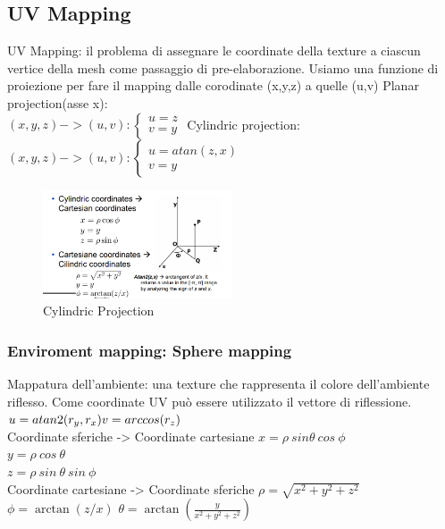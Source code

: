 \subsection{UV Mapping}

UV Mapping: il problema di assegnare le coordinate della texture a ciascun vertice della mesh come passaggio di pre-elaborazione.
Usiamo una funzione di proiezione per fare il mapping dalle corodinate (x,y,z) a quelle (u,v)
Planar projection(asse x): \\

$ (x,y,z) -> (u,v) :\begin{cases}
    u=z \\
    v=y
\end{cases}$
Cylindric projection: \\

$(x,y,z) -> (u,v) :\begin{cases}
    u=atan(z,x) \\
    v=y
\end{cases}$

\begin{figure}[H]
    \centering
    \includegraphics[width=0.5\textwidth]{images/project.png} 
    \caption{Cylindric Projection}
    \label{fig:immagine}
\end{figure}
\subsubsection{Enviroment mapping: Sphere mapping}
Mappatura dell'ambiente: una texture che rappresenta il colore dell'ambiente riflesso. Come coordinate UV può essere utilizzato il vettore di riflessione.
$ u= atan2(r_y,r_x) \\
 v= arccos(r_z)$ \\

Coordinate sferiche -> Coordinate cartesiane
$
x= \rho \ sin \theta \ cos \ \phi$ \\
\vspace{10pt} 
$y= \rho \ cos  \ \theta$ \\
$z=\rho \ sin\  \theta \ sin \ \phi$ \\
\vspace{10pt} 
Coordinate cartesiane  -> Coordinate sferiche 
$ \rho=\sqrt{x^2 + y^2+z^2}$
$ \phi=\arctan(z/x)$
$\theta=\arctan(\frac{y}{x^2+y^2+z^2})$

